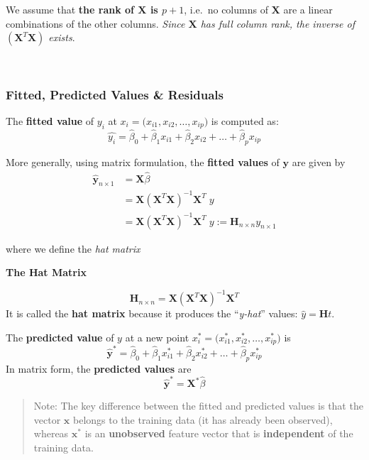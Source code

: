 \documentclass[
]{book}
\begin{document}
We assume that \textbf{the rank of \(\mathbf{X}\) is \(p+1\)}, i.e.~no columns of \(\mathbf{X}\) are a linear combinations of the other columns. \emph{Since \(\mathbf{X}\) has full column rank, the inverse of \((\mathbf{X}^T\mathbf{X})\) exists}.

~

\subsubsection*{Fitted, Predicted Values \& Residuals}\label{fitted-predicted-values-residuals}

The \textbf{fitted value} of \(y_i\) at \(x_i = \bigl( x_{i1}, x_{i2}, \ldots , x_{ip}\bigr)\) is computed as:
\[\hat{y_{i}} = \hat{\beta}_0 + \hat{\beta}_1 x_{i1}+ \hat{\beta}_2 x_{i2} + \ldots + \hat{\beta}_p x_{ip}\]

More generally, using matrix formulation, the \textbf{fitted values} of \(\mathbf{y}\) are given by
\begin{align*}
\hat{\mathbf{y}}_{n\times 1} &= \mathbf{X}  \hat{\beta} \\
&= \mathbf{X}  (\mathbf{X}^T\mathbf{X})^{-1} \mathbf{X}^T\; y\\
&=  \mathbf{X}  (\mathbf{X}^T\mathbf{X})^{-1} \mathbf{X}^T\; y := \mathbf{H}_{n \times n} y_{n\times 1}
\end{align*}

where we define the \emph{hat matrix}

\textbf{The Hat Matrix}

\[ \mathbf{H}_{n \times n} =  \mathbf{X}  (\mathbf{X}^T\mathbf{X})^{-1} \mathbf{X}^T\]
It is called the \textbf{hat matrix} because it produces the ``\emph{y-hat}'' values: \(\hat{y} = \mathbf{H} t\).

The \textbf{predicted value} of \(y\) at a new point \(x_i^* = \bigl( x_{i1}^*, x_{i2}^*, \ldots , x_{ip}^*\bigr)\) is
\[\hat{\mathbf{y}}^* = \hat{\beta}_0 + \hat{\beta}_1 x_{i1}^* + \hat{\beta}_2 x_{i2}^* + \ldots + \hat{\beta}_p x_{ip}^*\]
In matrix form, the \textbf{predicted values} are
\[\hat{\mathbf{y}}^* = \mathbf{X}^* \hat{\beta}\]

\begin{quote}
Note: The key difference between the fitted and predicted values is that the vector \(\mathbf{x}\) belongs to the training data (it has already been observed), whereas \(\mathbf{x}^*\) is an \textbf{unobserved} feature vector that is \textbf{independent} of the training data.
\end{quote}
\end{document}
